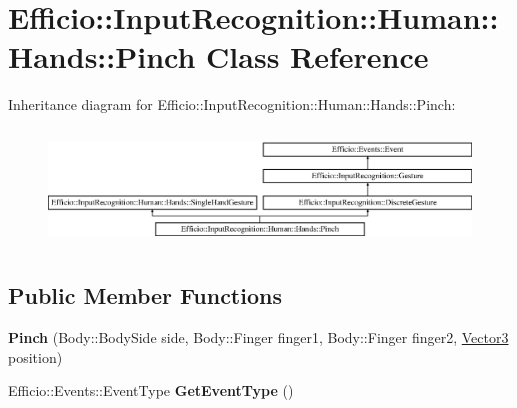 \hypertarget{class_efficio_1_1_input_recognition_1_1_human_1_1_hands_1_1_pinch}{}\section{Efficio\+:\+:Input\+Recognition\+:\+:Human\+:\+:Hands\+:\+:Pinch Class Reference}
\label{class_efficio_1_1_input_recognition_1_1_human_1_1_hands_1_1_pinch}
Inheritance diagram for Efficio\+:\+:Input\+Recognition\+:\+:Human\+:\+:Hands\+:\+:Pinch\+:\begin{figure}[H]
\begin{center}
\leavevmode
\includegraphics[height=3.137255cm]{class_efficio_1_1_input_recognition_1_1_human_1_1_hands_1_1_pinch}
\end{center}
\end{figure}
\subsection*{Public Member Functions}
\begin{DoxyCompactItemize}
\item 
{\bfseries Pinch} (Body\+::\+Body\+Side side, Body\+::\+Finger finger1, Body\+::\+Finger finger2, \hyperlink{class_efficio_1_1_vector3}{Vector3} position)\hypertarget{class_efficio_1_1_input_recognition_1_1_human_1_1_hands_1_1_pinch_a8471ee0196227f2c491925955449f534}{}\label{class_efficio_1_1_input_recognition_1_1_human_1_1_hands_1_1_pinch_a8471ee0196227f2c491925955449f534}

\item 
Efficio\+::\+Events\+::\+Event\+Type {\bfseries Get\+Event\+Type} ()\hypertarget{class_efficio_1_1_input_recognition_1_1_human_1_1_hands_1_1_pinch_a579897e092310066f9dab8df222fc863}{}\label{class_efficio_1_1_input_recognition_1_1_human_1_1_hands_1_1_pinch_a579897e092310066f9dab8df222fc863}

\end{DoxyCompactItemize}
